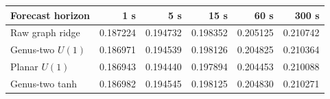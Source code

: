 \begin{tabular}{lrrrrr}\toprule
Forecast horizon & 1 s & 5 s & 15 s & 60 s & 300 s \\\midrule
Raw graph ridge & 0.187224 & 0.194732 & 0.198352 & 0.205125 & 0.210742 \\
Genus-two $U(1)$ & 0.186971 & 0.194539 & 0.198126 & 0.204825 & 0.210364 \\
Planar $U(1)$ & 0.186943 & 0.194440 & 0.197894 & 0.204453 & 0.210088 \\
Genus-two tanh & 0.186982 & 0.194545 & 0.198125 & 0.204830 & 0.210271 \\
\bottomrule\end{tabular}
